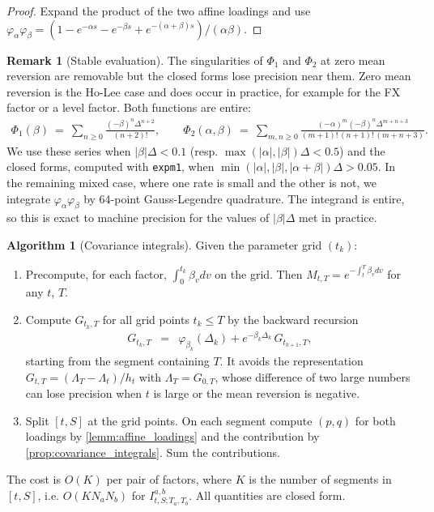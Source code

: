 \documentclass[11pt,english]{amsart}
\theoremstyle{definition}
\newtheorem{rema}{Remark}
\newtheorem{algo}{Algorithm}
\begin{document}
\begin{proof}
Expand the product of the two affine loadings and use $\varphi_\alpha\varphi_\beta = (1-e^{-\alpha s}-e^{-\beta s}+e^{-(\alpha+\beta)s})/(\alpha\beta)$.
\end{proof}

\begin{rema}[Stable evaluation]
The singularities of $\Phi_1$ and $\Phi_2$ at zero mean reversion are removable but the closed forms lose precision near them. Zero mean reversion is the Ho-Lee case and does occur in practice, for example for the FX factor or a level factor. Both functions are entire:
\begin{eqnarray*}
  \Phi_1(\beta) ~=~ \sum_{n\ge 0} \frac{(-\beta)^n\Delta^{n+2}}{(n+2)!} , \qquad
  \Phi_2(\alpha,\beta) ~=~ \sum_{m,n\ge 0} \frac{(-\alpha)^m(-\beta)^n\Delta^{m+n+3}}{(m+1)!\,(n+1)!\,(m+n+3)} .
\end{eqnarray*}
We use these series when $|\beta|\Delta < 0.1$ (resp. $\max(|\alpha|,|\beta|)\Delta < 0.5$) and the closed forms, computed with \texttt{expm1}, when $\min(|\alpha|,|\beta|,|\alpha+\beta|)\Delta > 0.05$. In the remaining mixed case, where one rate is small and the other is not, we integrate $\varphi_\alpha\varphi_\beta$ by 64-point Gauss-Legendre quadrature. The integrand is entire, so this is exact to machine precision for the values of $|\beta|\Delta$ met in practice.
\end{rema}

\begin{algo}[Covariance integrals]\label{algo:covariance_integrals}
Given the parameter grid $(t_k)$:
\begin{enumerate}
\item Precompute, for each factor, $\int_0^{t_k}\beta_v dv$ on the grid. Then $M_{t,T} = e^{-\int_t^T\beta_v dv}$ for any $t$, $T$.
\item Compute $G_{t_{k},T}$ for all grid points $t_k\le T$ by the backward recursion
\begin{eqnarray*}
  G_{t_k,T} &=& \varphi_{\beta_k}(\Delta_k) + e^{-\beta_k \Delta_k}\, G_{t_{k+1},T} ,
\end{eqnarray*}
starting from the segment containing $T$. It avoids the representation $G_{t,T} = (\Lambda_T - \Lambda_t)/h_t$ with $\Lambda_T = G_{0,T}$, whose difference of two large numbers can lose precision when $t$ is large or the mean reversion is negative.
\item Split $[t,S]$ at the grid points. On each segment compute $(p,q)$ for both loadings by \autoref{lemm:affine_loadings} and the contribution by \autoref{prop:covariance_integrals}. Sum the contributions.
\end{enumerate}
The cost is $O(K)$ per pair of factors, where $K$ is the number of segments in $[t,S]$, i.e. $O(K N_a N_b)$ for $I^{a,b}_{t,S;T_a,T_b}$. All quantities are closed form.
\end{algo}
\end{document}
